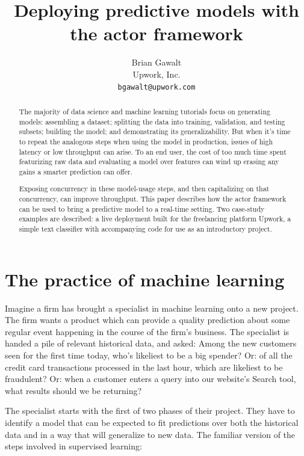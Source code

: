 \documentclass{article}
\begin{document}
\title{Deploying predictive models with the actor framework}
\author{Brian Gawalt \\
Upwork, Inc. \\
\texttt{bgawalt@upwork.com}
}

\maketitle

\begin{abstract}
 The majority of data science and machine learning tutorials focus on generating
models: assembling a dataset; splitting the data into training, validation, and
testing subsets; building the model; and demonstrating its generalizability. But
when it's time to repeat the analogous steps when using the model in production,
issues of high latency or low throughput can arise. To an end user, the cost of
too much time spent featurizing raw data and evaluating a model over features
can wind up erasing any gains a smarter prediction can offer.

 Exposing concurrency in these model-usage steps, and then capitalizing on that
concurrency, can improve throughput. This paper describes how the actor
framework can be used to bring a predictive model to a real-time setting. Two
case-study examples are described: a live deployment built for the freelancing 
platform Upwork, a simple text classifier with accompanying code for use as an
introductory project.
\end{abstract}

\section{The practice of machine learning}

 Imagine a firm has brought a specialist in machine learning onto a new project.
The firm wants a product which can provide a quality prediction about some
regular event happening in the course of the firm's business. The specialist is
handed a pile of relevant historical data, and asked: Among the new customers
seen for the first time today, who's likeliest to be a big spender? Or: of all
the credit card transactions processed in the last hour, which are likeliest to
be fraudulent? Or: when a customer enters a query into our website's Search
tool, what results should we be returning?

 The specialist starts with the first of two phases of their project. They have
to identify a model that can be expected to fit predictions over both the
historical data and in a way that will generalize to new data. The familiar
version of the steps involved in supervised learning:
\end{document}
